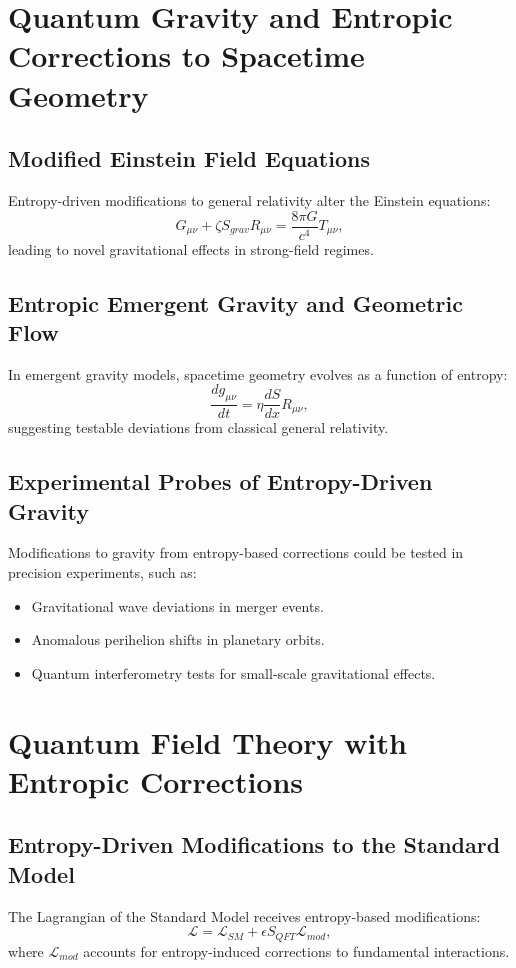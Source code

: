 \documentclass{article}
\begin{document}
\section{Quantum Gravity and Entropic Corrections to Spacetime Geometry}

\subsection{Modified Einstein Field Equations}
Entropy-driven modifications to general relativity alter the Einstein equations:
\begin{equation}
G_{\mu\nu} + \zeta S_{grav} R_{\mu\nu} = \frac{8\pi G}{c^4} T_{\mu\nu},
\end{equation}
leading to novel gravitational effects in strong-field regimes.

\subsection{Entropic Emergent Gravity and Geometric Flow}
In emergent gravity models, spacetime geometry evolves as a function of entropy:
\begin{equation}
\frac{d g_{\mu\nu}}{dt} = \eta \frac{dS}{dx} R_{\mu\nu},
\end{equation}
suggesting testable deviations from classical general relativity.

\subsection{Experimental Probes of Entropy-Driven Gravity}
Modifications to gravity from entropy-based corrections could be tested in precision experiments, such as:
\begin{itemize}
    \item Gravitational wave deviations in merger events.
    \item Anomalous perihelion shifts in planetary orbits.
    \item Quantum interferometry tests for small-scale gravitational effects.
\end{itemize}

\section{Quantum Field Theory with Entropic Corrections}

\subsection{Entropy-Driven Modifications to the Standard Model}
The Lagrangian of the Standard Model receives entropy-based modifications:
\begin{equation}
\mathcal{L} = \mathcal{L}_{SM} + \epsilon S_{QFT} \mathcal{L}_{mod},
\end{equation}
where $\mathcal{L}_{mod}$ accounts for entropy-induced corrections to fundamental interactions.
\end{document}
